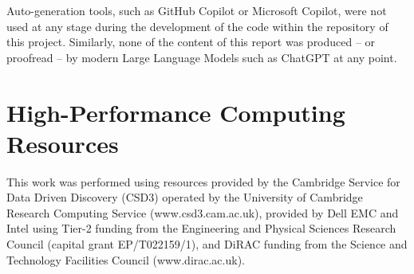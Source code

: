 \documentclass[12pt]{article}
\begin{document}
Auto-generation tools, such as GitHub Copilot or Microsoft Copilot, were not used at any stage during the development of the code within the repository of this project.
Similarly, none of the content of this report was produced -- or proofread -- by modern Large Language Models such as ChatGPT at any point.

\section {High-Performance Computing Resources}

This work was performed using resources provided by the Cambridge Service for Data Driven Discovery (CSD3) operated by the University of Cambridge Research Computing Service (www.csd3.cam.ac.uk),
provided by Dell EMC and Intel using Tier-2 funding from the Engineering and Physical Sciences Research Council (capital grant EP/T022159/1),
and DiRAC funding from the Science and Technology Facilities Council (www.dirac.ac.uk).
\end{document}
